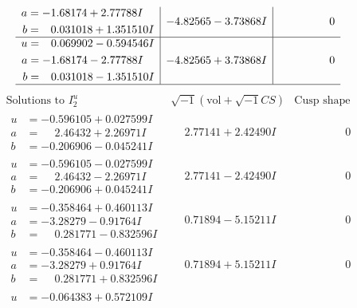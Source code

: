 \documentclass[1p]{elsarticle_modified}
\theoremstyle{definition}
\newcommand{\I}{\sqrt{-1}}
\begin{document}
$$\begin{array}{c|c|c}
\begin{aligned}
a &= -1.68174 + 2.77788 I \\
b &= \phantom{-}0.031018 + 1.351510 I\end{aligned}
 & -4.82565 - 3.73868 I & \phantom{-0.000000 } 0 \\ \hline\begin{aligned}
u &= \phantom{-}0.069902 - 0.594546 I \\
a &= -1.68174 - 2.77788 I \\
b &= \phantom{-}0.031018 - 1.351510 I\end{aligned}
 & -4.82565 + 3.73868 I & \phantom{-0.000000 } 0\\
 \hline 
 \end{array}$$\newpage$$\begin{array}{c|c|c}  
\text{Solutions to }I^u_{2}& \I (\text{vol} + \sqrt{-1}CS) & \text{Cusp shape}\\
 \hline 
\begin{aligned}
u &= -0.596105 + 0.027599 I \\
a &= \phantom{-}2.46432 + 2.26971 I \\
b &= -0.206906 - 0.045241 I\end{aligned}
 & \phantom{-}2.77141 + 2.42490 I & \phantom{-0.000000 } 0 \\ \hline\begin{aligned}
u &= -0.596105 - 0.027599 I \\
a &= \phantom{-}2.46432 - 2.26971 I \\
b &= -0.206906 + 0.045241 I\end{aligned}
 & \phantom{-}2.77141 - 2.42490 I & \phantom{-0.000000 } 0 \\ \hline\begin{aligned}
u &= -0.358464 + 0.460113 I \\
a &= -3.28279 - 0.91764 I \\
b &= \phantom{-}0.281771 - 0.832596 I\end{aligned}
 & \phantom{-}0.71894 - 5.15211 I & \phantom{-0.000000 } 0 \\ \hline\begin{aligned}
u &= -0.358464 - 0.460113 I \\
a &= -3.28279 + 0.91764 I \\
b &= \phantom{-}0.281771 + 0.832596 I\end{aligned}
 & \phantom{-}0.71894 + 5.15211 I & \phantom{-0.000000 } 0 \\ \hline\begin{aligned}
u &= -0.064383 + 0.572109 I \\

\end{aligned}
\end{array}$$
\end{document}
